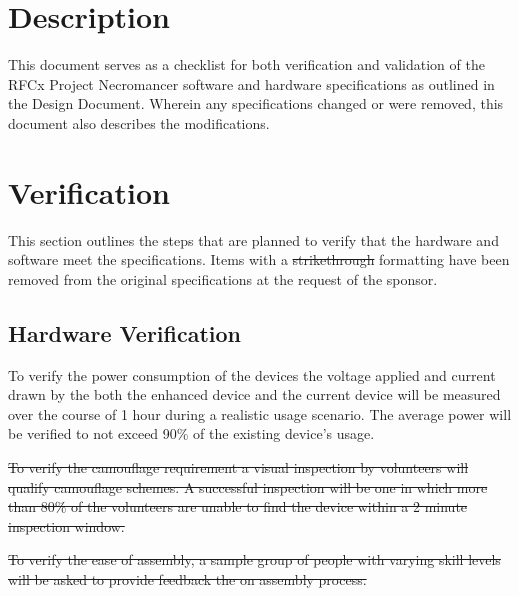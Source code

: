 \documentclass{article}
\newcommand{\ASSNMT}{Project Necromancer}
\numberwithin{figure}{section}
\numberwithin{equation}{section}
\begin{document}
\restoregeometry
\newpage
{
\pagestyle{fancy}
\fancyhf{}
\lhead{\ASSNMT}
\rhead{\leftmark}
\setlength{\parindent}{0cm}
\newpage
\tableofcontents
\newpage
\section{Description} \label{sect:description}
This document serves as a checklist for both verification and validation of the RFCx Project Necromancer software and hardware specifications as outlined in the Design Document. Wherein any specifications changed or were removed, this document also describes the modifications.

\newpage

\section{Verification} \label{sect:verification}
This section outlines the steps that are planned to verify that the hardware and software meet the specifications. Items with a \sout{strikethrough} formatting have been removed from the original specifications at the request of the sponsor.

\subsection{Hardware Verification} \label{sect:hardwareverification}
To verify the power consumption of the devices the voltage applied and current drawn by the both the enhanced device and the current device will be measured over the course of 1 hour during a realistic usage scenario. The average power will be verified to not exceed 90\% of the existing device’s usage.

\bigskip

\sout{To verify the camouflage requirement a visual inspection by volunteers will qualify camouflage schemes. A successful inspection will be one in which more than 80\% of the volunteers are unable to find the device within a 2 minute inspection window.}

\bigskip

\sout{To verify the ease of assembly, a sample group of people with varying skill levels will be asked to provide feedback the on assembly process.}

}
\end{document}
